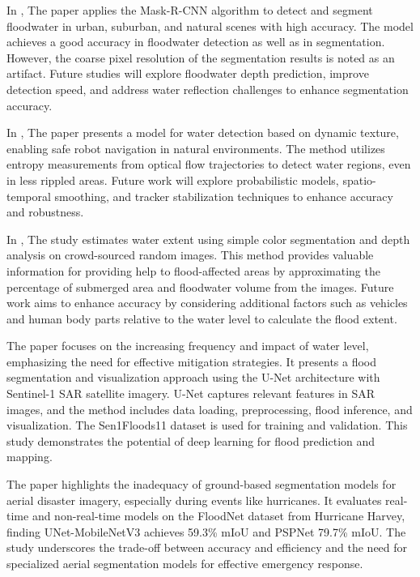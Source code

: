 In \cite{rel7}, The paper applies the Mask-R-CNN algorithm to detect and segment floodwater in urban, suburban, and natural scenes with high accuracy. The model achieves a good accuracy in floodwater detection as well as in segmentation. However, the coarse pixel resolution of the segmentation results is noted as an artifact. Future studies will explore floodwater depth prediction, improve detection speed, and address water reflection challenges to enhance segmentation accuracy.



In \cite{rel8}, The paper presents a model for water detection based on dynamic texture, enabling safe robot navigation in natural environments. The method utilizes entropy measurements from optical flow trajectories to detect water regions, even in less rippled areas. Future work will explore probabilistic models, spatio-temporal smoothing, and tracker stabilization techniques to enhance accuracy and robustness.

In \cite{rel10}, The study estimates water extent using simple color segmentation and depth analysis on crowd-sourced random images. This method provides valuable information for providing help to flood-affected areas by approximating the percentage of submerged area and floodwater volume from the images. Future work aims to enhance accuracy by considering additional factors such as vehicles and human body parts relative to the water level to calculate the flood extent.

The paper \cite{rel11} focuses on the increasing frequency and impact of water level, emphasizing the need for effective mitigation strategies. It presents a flood segmentation and visualization approach using the U-Net architecture with Sentinel-1 SAR satellite imagery. U-Net captures relevant features in SAR images, and the method includes data loading, preprocessing, flood inference, and visualization. The Sen1Floods11 dataset is used for training and validation. This study demonstrates the potential of deep learning for flood prediction and mapping.


The paper \cite{rel12} highlights the inadequacy of ground-based segmentation models for aerial disaster imagery, especially during events like hurricanes. It evaluates real-time and non-real-time models on the FloodNet dataset from Hurricane Harvey, finding UNet-MobileNetV3 achieves 59.3\% mIoU and PSPNet 79.7\% mIoU. The study underscores the trade-off between accuracy and efficiency and the need for specialized aerial segmentation models for effective emergency response.



